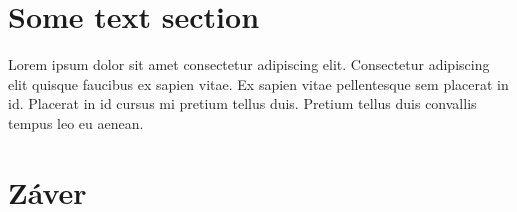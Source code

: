 \documentclass[10pt,twoside,slovak,a4paper]{article}
\begin{document}
\section{Some text section}
Lorem ipsum dolor sit amet consectetur adipiscing elit. Consectetur adipiscing elit quisque faucibus ex sapien vitae. Ex sapien vitae pellentesque sem placerat in id. Placerat in id cursus mi pretium tellus duis. Pretium tellus duis convallis tempus leo eu aenean.


\section{Záver} \label{zaver} %






\end{document}
